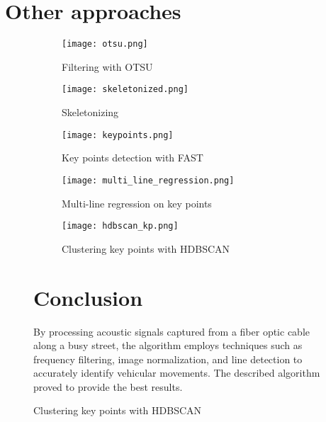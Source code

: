 \documentclass{article}
\begin{document}
\section{Other approaches}
\begin{figure}[!htbp]
    \centering
    \begin{subfigure}{0.45\textwidth}
        \centering
        \texttt{[image: otsu.png]}
        \caption{Filtering with OTSU}
        \label{fig:otsu}
    \end{subfigure}
    \hfill
    \begin{subfigure}{0.45\textwidth}
        \centering
        \texttt{[image: skeletonized.png]}
        \caption{Skeletonizing}
        \label{fig:skeleton}
    \end{subfigure}

    \begin{subfigure}{0.45\textwidth}
        \centering
        \texttt{[image: keypoints.png]}
        \caption{Key points detection with FAST}
        \label{fig:kp}
    \end{subfigure}
    \hfill
    \begin{subfigure}{0.45\textwidth}
        \centering
        \texttt{[image: multi\_line\_regression.png]}
        \caption{Multi-line regression on key points}
        \label{fig:multiline}
    \end{subfigure}

    \begin{subfigure}{0.45\textwidth}
        \centering
        \texttt{[image: hdbscan\_kp.png]}
        \caption{Clustering key points with HDBSCAN}
        \label{fig:hdbscan}
    \end{subfigure}
    \hfill
    \begin{minipage}[b]{0.45\textwidth}
        \section{Conclusion}
        By processing acoustic signals captured from a fiber optic cable along a busy street, the algorithm employs techniques such as frequency filtering, image normalization, and line detection to accurately identify vehicular movements. The described algorithm proved to provide the best results.
    \end{minipage}

\end{figure}

% 
% 
\end{document}
